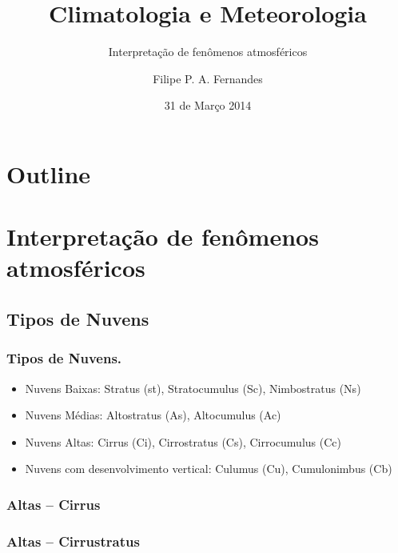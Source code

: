 \title[Aula 07]{Climatologia e Meteorologia}
\subtitle{Interpretação de fenômenos atmosféricos}
\author[Filipe Fernandes]{Filipe P. A. Fernandes}
\date[Março 2014]{31 de Março 2014}




\begin{frame}[plain]
  \titlepage
\end{frame}

\section*{Outline}
\begin{frame}
\tableofcontents
\end{frame}

\section{Interpretação de fenômenos atmosféricos}
\subsection{Tipos de Nuvens}
\begin{frame}
\frametitle{Tipos de Nuvens.}
  \begin{itemize}[<+-| alert@+>]
    \item Nuvens Baixas: Stratus (st), Stratocumulus (Sc), Nimbostratus (Ns)
    \item Nuvens Médias: Altostratus (As), Altocumulus (Ac)
    \item Nuvens Altas: Cirrus (Ci), Cirrostratus (Cs), Cirrocumulus (Cc)
    \item Nuvens com desenvolvimento vertical: Culumus (Cu), Cumulonimbus (Cb)
  \end{itemize}
\end{frame}

\begin{frame}
\frametitle{Altas -- Cirrus}
  \begin{center}
  \end{center}
\end{frame}

\begin{frame}
\frametitle{Altas -- Cirrustratus}
  \begin{center}
  \end{center}
\end{frame}

